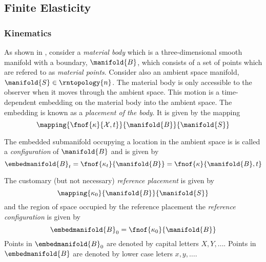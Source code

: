  
\subsection{Finite Elasticity}
\label{subsec:FiniteElasticity}


\subsubsection{Kinematics}

As shown in , consider a \textit{material
  body} which is a three-dimensional smooth manifold with a boundary, $\manifold{B}$,
which consists of a set of points which are refered to as \textit{material
  points}. Consider also an ambient space manifold,
$\manifold{S}\in\rntopology{n}$. The material body is only accessible to
the observer when it moves through the ambient space. This motion is a
time-dependent embedding on the material body into the ambient space. The
embedding is known as a \textit{placement of the body}. It is given by the
mapping
\begin{equation}
  \mapping{\fnof{\kappa}{\mathcal{X},t}}{\manifold{B}}{\manifold{S}}
\end{equation}

The embedded submanifold occupying a location in the ambient space is is
called a \textit{configuration} of $\manifold{B}$ and is given by
\begin{equation}
  \embedmanifold{B}_{t}=\fnof{\kappa_{t}}{\manifold{B}}=\fnof{\kappa}{\manifold{B},t}
\end{equation}

The customary (but not necessary) \textit{reference placement} is given by
\begin{equation}
  \mapping{\kappa_{0}}{\manifold{B}}{\manifold{S}}
\end{equation}
and the region of space occupied by the reference placement \ie the
\textit{reference configuration} is given by
\begin{equation}
  \embedmanifold{B}_{0}=\fnof{\kappa_{0}}{\manifold{B}}
\end{equation}
Points in $\embedmanifold{B}_{0}$ are denoted by capital letters \ie $X, Y,
\ldots$. Points in $\embedmanifold{B}$ are denoted by lower case leters \ie
$x, y, \dots$.

